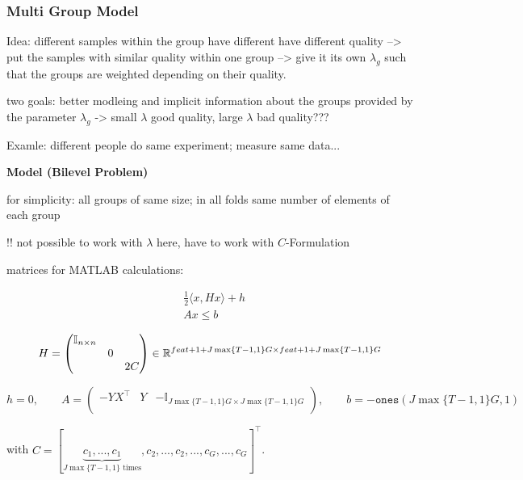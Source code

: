 \subsubsection{Multi Group Model}

Idea: different samples within the group have different have different quality --> put the samples with similar quality within one group --> give it its own \(\lambda_g\) such that the groups are weighted depending on their quality.

two goals: better modleing and implicit information about the groups provided by the parameter \(\lambda_g\) -> small \(\lambda\) good quality, large \(\lambda\) bad quality???

Examle: different people do same experiment; measure same data...

\textbf{Model (Bilevel Problem)}


for simplicity: all groups of same size; in all folds same number of elements of each group

!! not possible to work with \(\lambda\) here, have to work with \(C\)-Formulation



matrices for MATLAB calculations:

\begin{equation*}
\begin{split}
	& \frac{1}{2} \langle x,Hx \rangle + h \\
	& Ax \leq b
\end{split}
\end{equation*}

\begin{equation}
	H = \begin{pmatrix}
		\mathbb{I}_{n\times n} \\
		& 0 \\
		& & 2 C \\
	\end{pmatrix}
	\in \mathbb{R}^{feat+1+J\max\{T-1,1\}G\times feat+1+J\max\{T-1,1\}G}
\end{equation}

\[ h = 0, \qquad A = \begin{pmatrix} -YX^{\top} & Y & -\mathbb{I}_{J\max\{T-1,1\}G \times J\max\{T-1,1\}G} \\ \end{pmatrix},  \qquad b = -\mathtt{ones}(J\max\{T-1,1\}G,1) \] 

with \(C = [\underbrace{c_1,...,c_1}_{J\max\{T-1,1\} \text{ times}},c_2,...,c_2,...,c_G,...,c_G]^{\top}\).

